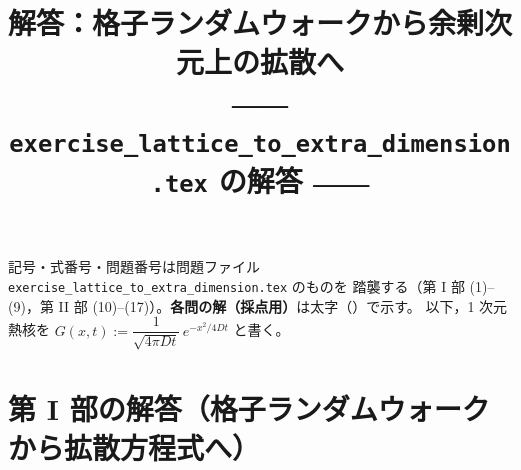 \documentclass[dvipdfmx, uplatex]{jsarticle}
\title{解答：格子ランダムウォークから余剰次元上の拡散へ\\
\large ―― \texttt{exercise\_lattice\_to\_extra\_dimension.tex} の解答 ――}
\author{}
\date{}
\theoremstyle{definition}
\begin{document}
\maketitle
\vspace{-6zh}

記号・式番号・問題番号は問題ファイル \texttt{exercise\_lattice\_to\_extra\_dimension.tex} のものを
踏襲する（第 I 部 (1)--(9)，第 II 部 (10)--(17)）。\textbf{各問の解（採点用）}は太字（\boxed）で示す。
以下，1 次元熱核を $G(x,t):=\dfrac{1}{\sqrt{4\pi Dt}}\,e^{-x^2/4Dt}$ と書く。

\section{第 I 部の解答（格子ランダムウォークから拡散方程式へ）}
\end{document}
